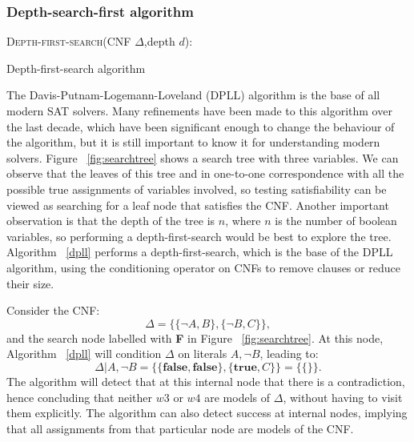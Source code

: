 \documentclass[12pt]{diicc}
\begin{document}
\subsubsection{Depth-search-first algorithm}

\begin{algorithm}
\textsc{Depth-first-search}(CNF $\Delta$,depth $d$):\\
\caption{Depth-first-search algorithm\label{dpll}}
\end{algorithm}    

The Davis-Putnam-Logemann-Loveland (DPLL) \cite{dpll} algorithm is the base of all modern SAT solvers. Many refinements have been made to this algorithm over the last decade, which have been significant enough to change the behaviour of the algorithm, but it is still important to know it for understanding modern solvers. Figure ~\ref{fig:searchtree} shows a search tree with three variables. We can observe that the leaves of this tree and in one-to-one correspondence with all the possible true assignments of variables involved, so testing satisfiability can be viewed as searching for a leaf node that satisfies the CNF. Another important observation is that the depth of the tree is $n$, where $n$ is the number of boolean variables, so performing a depth-first-search would be best to explore the tree. Algorithm ~\ref{dpll} performs a depth-first-search, which is the base of the DPLL algorithm, using the conditioning operator on CNFs to remove clauses or reduce their size.

Consider the CNF:
\[\Delta=\{\{\neg A,B\},\{\neg B,C\}\},\]
and the search node labelled with \textbf{F} in Figure ~\ref{fig:searchtree}. At this node, Algorithm ~\ref{dpll} will condition $\Delta$ on literals $A,\neg B$, leading to:
\[\Delta |A,\neg B=\{ \{\textbf{false},\textbf{false}\},\{\textbf{true},C\}\}=\{\{\}\}.\]
The algorithm will detect that at this internal node that there is a contradiction, hence concluding that neither $w3$ or $w4$ are models of $\Delta$, without having to visit them explicitly. The algorithm can also detect success at internal nodes, implying that all assignments from that particular node are models of the CNF.
\end{document}
